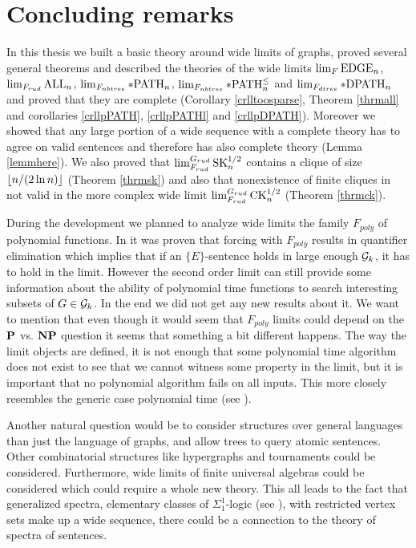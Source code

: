 \chapter*{Concluding remarks}

In this thesis we built a basic theory around wide limits of graphs, proved several general theorems and described the theories of the wide limits $\lim_F\EDGE_n$, $\lim_{F_{rud}}\ALL_n$, $\lim_{F_{nbtree}}\pPATH_n$, $\lim_{F_{nbtree}}\pPATHl_n$ and $\lim_{F_{dtree}}\pDPATH_n$ and proved that they are complete (Corollary \ref{crlltoosparse}, Theorem \ref{thrmall} and corollaries \ref{crllpPATH}, \ref{crllpPATHl} and \ref{crllpDPATH}). Moreover we showed that any large portion of a wide sequence with a complete theory has to agree on valid sentences and therefore has also complete theory (Lemma \ref{lemmhere}). We also proved that $\lim_{F_{rud}}^{G_{rud}}\SK_n^{1/2}$ contains a clique of size $\floor{n/(2\ln n)}$ (Theorem \ref{thrmsk}) and also that nonexistence of finite cliques in not valid in the more complex wide limit $\lim_{F_{rud}}^{G_{rud}}\CK_n^{1/2}$ (Theorem \ref{thrmck}).

During the development we planned to analyze wide limits the family $F_{poly}$ of polynomial functions. In \cite{krajicek2010forcing} it was proven that forcing with $F_{poly}$ results in quantifier elimination which implies that if an $\{E\}$-sentence holds in large enough $\G_k$, it has to hold in the limit. However the second order limit can still provide some information about the ability of polynomial time functions to search interesting subsets of $G\in\G_k$. In the end we did not get any new results about it. We want to mention that even though it would seem that $F_{poly}$ limits could depend on the $\P$ vs. $\NP$ question it seems that something a bit different happens. The way the limit objects are defined, it is not enough that some polynomial time algorithm does not exist to see that we cannot witness some property in the limit, but it is important that no polynomial algorithm fails on all inputs. This more closely resembles the generic case polynomial time (see \cite{gilman2007report}).

Another natural question would be to consider structures over general languages than just the language of graphs, and allow trees to query atomic sentences. Other combinatorial structures like hypergraphs and tournaments could be considered. Furthermore, wide limits of finite universal algebras could be considered which could require a whole new theory. This all leads to the fact that generalized spectra, elementary classes of $\Sigma_1^1$-logic (see \cite{Fagin74}), with restricted vertex sets make up a wide sequence, there could be a connection to the theory of spectra of sentences.


